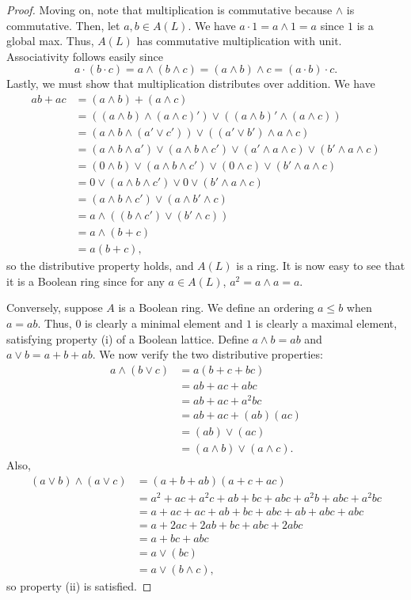 \begin{proof}
Moving on, note that multiplication is commutative because $\wedge$ is commutative. Then, let $a,b \in A(L)$. We have $a \cdot 1 = a \wedge 1 = a$ since $1$ is a global max. Thus, $A(L)$ has commutative
multiplication with unit. Associativity follows easily since
$$a\cdot(b\cdot c) = a \wedge(b \wedge c) = (a \wedge b) \wedge c = (a \cdot b) \cdot c.$$
Lastly, we must show that multiplication distributes over addition. We have
\begin{align*}
ab + ac &= (a \wedge b) + (a \wedge c) \\
&= ((a \wedge b) \wedge (a \wedge c)') \vee ((a \wedge b)' \wedge (a \wedge c)) \\ 
&= (a \wedge b \wedge (a' \vee c')) \vee ((a' \vee b') \wedge a \wedge c) \\ 
&= (a \wedge b \wedge a') \vee (a \wedge b \wedge c') \vee (a'\wedge a \wedge c) \vee (b'\wedge a \wedge c) \\ 
&= (0 \wedge b) \vee (a \wedge b \wedge c') \vee (0 \wedge c) \vee (b'\wedge a \wedge c) \\ 
&= 0 \vee (a \wedge b \wedge c') \vee 0 \vee (b'\wedge a \wedge c) \\ 
&= (a \wedge b \wedge c') \vee (a \wedge b' \wedge c) \\ 
&= a \wedge ((b \wedge c') \vee (b' \wedge c)) \\ 
&= a \wedge (b + c) \\
&= a(b+c), 
\end{align*}
so the distributive property holds, and $A(L)$ is a ring. It is now easy to see that it is a Boolean ring since for any $a \in A(L)$, $a^2 = a \wedge a = a$.

Conversely, suppose $A$ is a Boolean ring. We define an ordering $a \le b$ when $a = ab$. Thus, $0$ is clearly a minimal element and $1$ is clearly a maximal element,
satisfying property (i) of a Boolean lattice. Define $a \wedge b = ab$ and $a \vee b = a + b + ab$. We now verify the two distributive properties:
\begin{align*}
a \wedge (b \vee c) &= a(b + c + bc) \\
&= ab + ac + abc \\
&= ab + ac + a^2bc \\
&= ab + ac + (ab)(ac) \\
&= (ab) \vee (ac) \\
&= (a \wedge b) \vee (a \wedge c).
\end{align*}
Also,
\begin{align*}
(a \vee b) \wedge (a \vee c) &= (a + b + ab)(a + c + ac) \\
&= a^2 + ac + a^2c + ab + bc + abc + a^2b + abc + a^2bc \\
&= a + ac + ac + ab + bc + abc + ab + abc + abc \\
&= a + 2ac + 2ab + bc + abc + 2abc \\
&= a + bc + abc \\
&= a \vee (bc) \\
&= a \vee (b \wedge c),
\end{align*}
so property (ii) is satisfied.


\end{proof}
